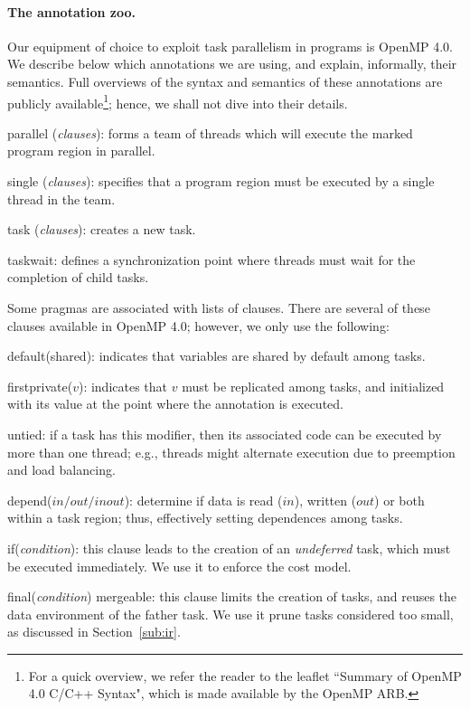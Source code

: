 \documentclass[sigplan,10pt,screen]{acmart}
\begin{document}
\paragraph{The annotation zoo.}
Our equipment of choice to exploit task parallelism in programs is OpenMP 4.0.
We describe below which annotations we are using, and explain, informally, their
semantics.
Full overviews of the syntax and semantics of these annotations are publicly
available\footnote{For a quick overview, we refer the reader to the leaflet
``Summary of OpenMP 4.0 C/C++ Syntax", which is made available by the OpenMP
ARB.}; hence, we shall not dive into their details.
%
\begin{compactitem}
\item \textsf{parallel} (\textit{clauses}): forms a team of threads
which will execute the marked program region in parallel.
\item \textsf{single} (\textit{clauses}): specifies that a
program region must be executed by a single thread in the team.
\item \textsf{task} (\textit{clauses}): creates a new task.
\item \textsf{taskwait}: defines a synchronization point where
threads must wait for the completion of child tasks.
\end{compactitem}
%
Some pragmas are associated with lists of clauses.
There are several of these clauses available in OpenMP 4.0; however, we only use
the following:
\begin{compactitem}
\item \textsf{default(shared)}: indicates that variables are
shared by default among tasks.
\item \textsf{firstprivate($v$)}: indicates that $v$ must be replicated among
tasks, and initialized with its value at the point where the annotation is
executed.
\item \textsf{untied}: if a task has this modifier, then its associated code can
be executed by more than one thread; e.g., threads might alternate execution due
to preemption and load balancing.
\item \textsf{depend}($\mathit{in}/\mathit{out}/\mathit{inout}$):
determine if data is read ($\mathit{in}$), written ($\mathit{out}$) or both
within a task region; thus, effectively setting dependences among tasks.
\item \textsf{if}({\em condition}): this clause leads to the creation of an {\em undeferred}
task, which must be executed immediately.
We use it to enforce the cost model.
\item \textsf{final}({\em condition}) \textsf{mergeable}: this clause limits the creation of
tasks, and reuses the data environment of the father task.
We use it prune tasks considered too small, as discussed in Section~\ref{sub:ir}.
\end{compactitem}
\end{document}
